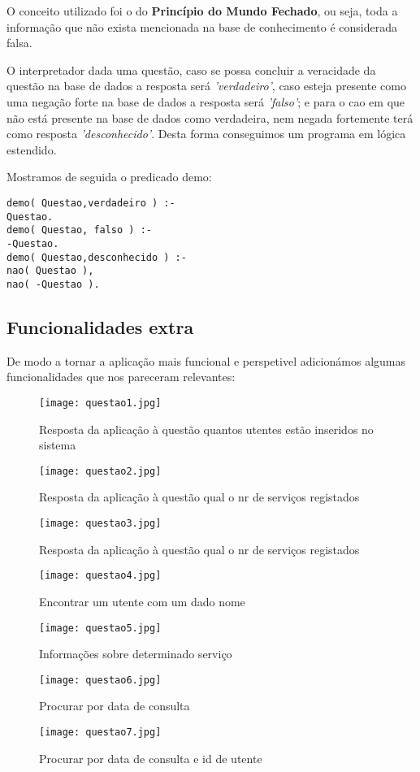 O conceito utilizado foi o do \textbf{Princípio do Mundo Fechado}, ou seja, toda a informação que não exista mencionada na base de conhecimento é considerada falsa. 

O interpretador dada uma questão, caso se possa concluir a veracidade da questão na base de dados a resposta será \textit{'verdadeiro'}, caso esteja presente como uma negação forte na base de dados a resposta será \textit{'falso'}; e para o cao em que não está presente na base de dados como verdadeira, nem negada fortemente terá como resposta \textit{'desconhecido'}. Desta forma conseguimos um programa em lógica estendido. 

Mostramos de seguida o predicado demo: 
\begin{verbatim}
demo( Questao,verdadeiro ) :-
Questao.
demo( Questao, falso ) :-
-Questao.
demo( Questao,desconhecido ) :-
nao( Questao ),
nao( -Questao ).
\end{verbatim}

\subsection{Funcionalidades extra}
De modo a tornar a aplicação mais funcional e perspetivel adicionámos algumas funcionalidades que nos pareceram relevantes: 

\begin{figure}[<+htb+>]
	\centering
	\texttt{[image: questao1.jpg]}
	\caption{Resposta da aplicação à questão quantos utentes estão inseridos no sistema}
\end{figure}

\begin{figure}[<+htb+>]
	\centering
	\texttt{[image: questao2.jpg]}
	\caption{Resposta da aplicação à questão qual o nr de serviços registados}
\end{figure}

\begin{figure}[<+htb+>]
	\centering
	\texttt{[image: questao3.jpg]}
	\caption{Resposta da aplicação à questão qual o nr de serviços registados}
\end{figure}

\begin{figure}[<+ht+>]
	\centering
	\texttt{[image: questao4.jpg]}
	\caption{Encontrar um utente com um dado nome }
\end{figure}


\begin{figure}[<+ht+>]
	\centering
	\texttt{[image: questao5.jpg]}
	\caption{Informações sobre determinado serviço}
\end{figure}


\begin{figure}[<+ht+>]
	\centering
	\texttt{[image: questao6.jpg]}
	\caption{Procurar por data de consulta}
\end{figure}

\begin{figure}[<+ht+>]
	\centering
	\texttt{[image: questao7.jpg]}
	\caption{Procurar por data de consulta e id de utente}
\end{figure}





